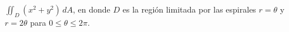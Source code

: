 \item $\iint_D (x^2 + y^2) \, dA$, en donde $D$ es la región limitada por las espirales $r = \theta$ y $r = 2\theta$ para $0 \le \theta \le 2\pi$.
